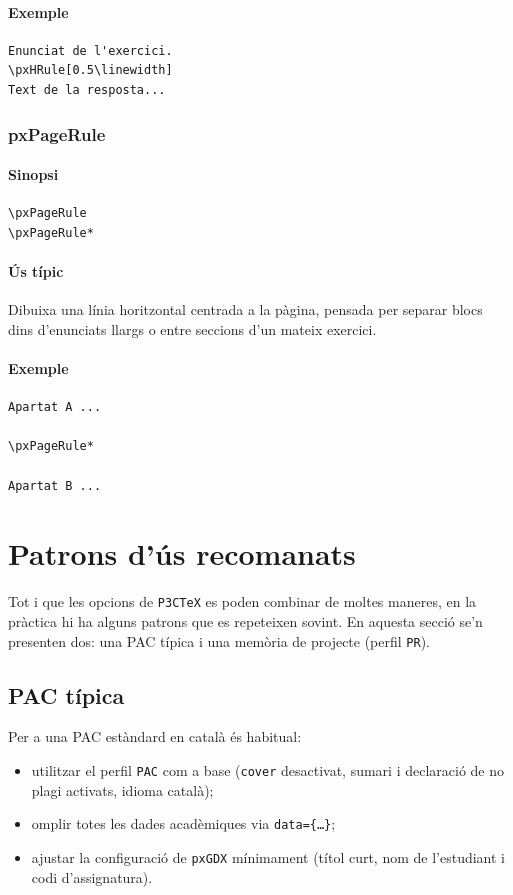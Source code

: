 \documentclass[default]{P3CTeX}
\begin{document}
\paragraph*{Exemple}
\begin{verbatim}
Enunciat de l'exercici.
\pxHRule[0.5\linewidth]
Text de la resposta...
\end{verbatim}

\subsubsection{pxPageRule}

\paragraph*{Sinopsi}
\begin{verbatim}
\pxPageRule
\pxPageRule*
\end{verbatim}

\paragraph*{Ús típic}
Dibuixa una línia horitzontal centrada a la pàgina, pensada per separar
blocs dins d'enunciats llargs o entre seccions d'un mateix exercici.

\paragraph*{Exemple}
\begin{verbatim}
Apartat A ...

\pxPageRule*

Apartat B ...
\end{verbatim}

\section{Patrons d'ús recomanats}

Tot i que les opcions de \texttt{P3CTeX} es poden combinar de moltes
maneres, en la pràctica hi ha alguns patrons que es repeteixen sovint.
En aquesta secció se'n presenten dos: una PAC típica i una memòria de
projecte (perfil \texttt{PR}).

\subsection{PAC típica}

Per a una PAC estàndard en català és habitual:
\begin{itemize}
  \item utilitzar el perfil \texttt{PAC} com a base (\texttt{cover} desactivat,
        sumari i declaració de no plagi activats, idioma català);
  \item omplir totes les dades acadèmiques via \texttt{data=\{\dots\}};
  \item ajustar la configuració de \texttt{pxGDX} mínimament (títol curt,
        nom de l'estudiant i codi d'assignatura).
\end{itemize}
\end{document}
